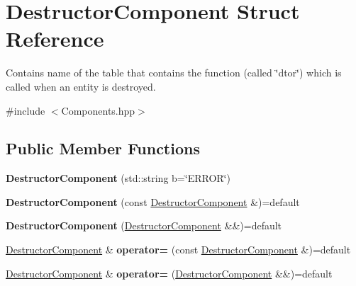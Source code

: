 \hypertarget{struct_destructor_component}{}\section{Destructor\+Component Struct Reference}
\label{struct_destructor_component}


Contains name of the table that contains the function (called \char`\"{}dtor\char`\"{}) which is called when an entity is destroyed.  




{\ttfamily \#include $<$Components.\+hpp$>$}

\subsection*{Public Member Functions}
\begin{DoxyCompactItemize}
\item 
{\bfseries Destructor\+Component} (std\+::string b=\char`\"{}E\+R\+R\+OR\char`\"{})\hypertarget{struct_destructor_component_aebc03621eaa6822682f712e58bdbd673}{}\label{struct_destructor_component_aebc03621eaa6822682f712e58bdbd673}

\item 
{\bfseries Destructor\+Component} (const \hyperlink{struct_destructor_component}{Destructor\+Component} \&)=default\hypertarget{struct_destructor_component_acfe9290b3966e8b99ccd174ee5d832ba}{}\label{struct_destructor_component_acfe9290b3966e8b99ccd174ee5d832ba}

\item 
{\bfseries Destructor\+Component} (\hyperlink{struct_destructor_component}{Destructor\+Component} \&\&)=default\hypertarget{struct_destructor_component_a64114c34c256244d6e3b5ec61a5f933a}{}\label{struct_destructor_component_a64114c34c256244d6e3b5ec61a5f933a}

\item 
\hyperlink{struct_destructor_component}{Destructor\+Component} \& {\bfseries operator=} (const \hyperlink{struct_destructor_component}{Destructor\+Component} \&)=default\hypertarget{struct_destructor_component_ae054b00544dbe4ff739cad5024d76def}{}\label{struct_destructor_component_ae054b00544dbe4ff739cad5024d76def}

\item 
\hyperlink{struct_destructor_component}{Destructor\+Component} \& {\bfseries operator=} (\hyperlink{struct_destructor_component}{Destructor\+Component} \&\&)=default\hypertarget{struct_destructor_component_a426b010b77796f43f476f906c161bf2c}{}\label{struct_destructor_component_a426b010b77796f43f476f906c161bf2c}

\end{DoxyCompactItemize}
